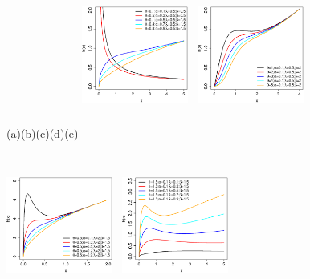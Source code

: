 \documentclass[12pt]{article}
\begin{document}
\begin{figure}[!htb]\small
	\begin{center}
		(a)\hspace{3cm}(b)\hspace{3cm}(c)\hspace{3cm}(d)\hspace{3cm}(e)	
		\includegraphics[width=3.5cm,height=5.5cm]{hrf_MOTPW_variando_theta_e_alpha.eps}~
		\includegraphics[width=3.5cm,height=5.5cm]{hrf_MOTPW_variando_theta.eps}~
		\includegraphics[width=3.5cm,height=5.5cm]{hrf_MOTPW_variando_alpha.eps}~
		\includegraphics[width=3.5cm,height=5.5cm]{hrf_MOTPW_variando_lambda.eps}~

\end{center}
\end{figure}
\end{document}
